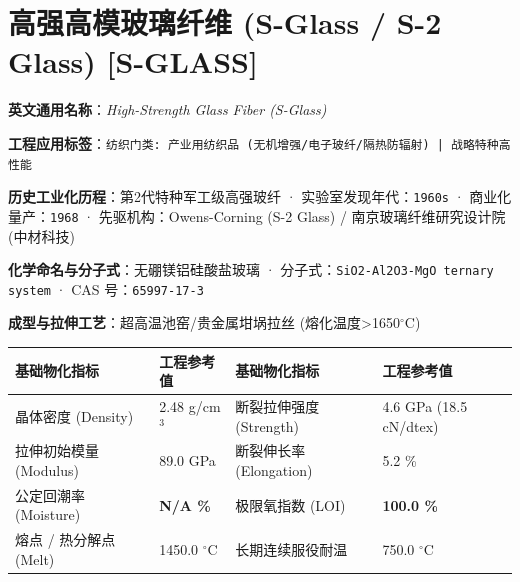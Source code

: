 \documentclass[11pt,openright,twoside,UTF8]{ctexbook}
\begin{document}
\section{高强高模玻璃纤维 (S-Glass / S-2 Glass) [S-GLASS]}
\label{sec:s-glass}

\noindent\textbf{英文通用名称}：\textit{High-Strength Glass Fiber (S-Glass)}\par
\noindent\textbf{工程应用标签}：\texttt{纺织门类: 产业用纺织品 (无机增强/电子玻纤/隔热防辐射) | 战略特种高性能}\par
\noindent\textbf{历史工业化历程}：第2代特种军工级高强玻纤 · 实验室发现年代：\texttt{1960s} · 商业化量产：\texttt{1968} · 先驱机构：Owens-Corning (S-2 Glass) / 南京玻璃纤维研究设计院 (中材科技)\par
\noindent\textbf{化学命名与分子式}：无硼镁铝硅酸盐玻璃 · 分子式：\texttt{SiO2-Al2O3-MgO ternary system} · CAS 号：\texttt{65997-17-3}\par
\noindent\textbf{成型与拉伸工艺}：超高温池窑/贵金属坩埚拉丝 (熔化温度\textgreater{}1650$^\circ\mathrm{C}$)\par

\vspace{0.15cm}
\begin{center}
\small
\begin{tabularx}{\textwidth}{p{3.8cm}Xp{3.8cm}X}
\toprule
\textbf{基础物化指标} & \textbf{工程参考值} & \textbf{基础物化指标} & \textbf{工程参考值} \\
\midrule
晶体密度 (Density) & 2.48 g/cm$^3$ & 断裂拉伸强度 (Strength) & 4.6 GPa (18.5 cN/dtex) \\
拉伸初始模量 (Modulus) & 89.0 GPa & 断裂伸长率 (Elongation) & 5.2 \% \\
公定回潮率 (Moisture) & \textbf{N/A \%} & 极限氧指数 (LOI) & \textbf{100.0 \%} \\
熔点 / 热分解点 (Melt) & 1450.0 $^\circ\mathrm{C}$ & 长期连续服役耐温 & 750.0 $^\circ\mathrm{C}$ \\
\bottomrule
\end{tabularx}
\end{center}
\vspace{0.15cm}
\end{document}
